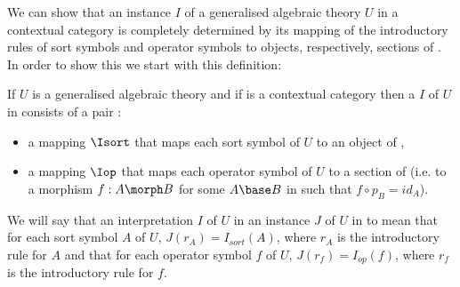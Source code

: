 

We can show that an instance $I$ of a generalised algebraic theory $U$ in a contextual category \catcw is
completely determined by its mapping of the introductory rules of sort symbols and operator symbols to
objects, respectively, sections of \catc. In order to show this we start with this definition:
\begin{definition}
If $U$ is a generalised algebraic theory  and if \catcw is a contextual category then
a  $I$ of  $U$ in \catcw consists of a pair :
\begin{itemize}
\item a mapping $\Isort$ that maps each sort symbol of $U$ to  an object of \catc,
\item a mapping $\Iop$ that maps each operator symbol of $U$ to a section of \catcw (i.e. to a morphism $f: A \morph B$ for some 
$A \base B$ in \catcw such that $f \circ p_B=id_A$).
\end{itemize}
\end{definition}


We will say that  an interpretation $I$ of $U$ in \catcw {} an  instance $J$ of $U$ in \catcw to mean that for each sort symbol $A$ of $U$,
$J(r_A) = I_{sort}(A)$, where $r_A$ is the introductory rule for $A$ and that for each operator symbol
$f$ of $U$,   $J(r_f) = I_{op}(f)$, where $r_f$ is the introductory rule for $f$.

\newcommand{\Ibar}{\mkern 2.5mu\overline{\mkern-2.5mu I\mkern1.5mu}\mkern -1.5mu}


